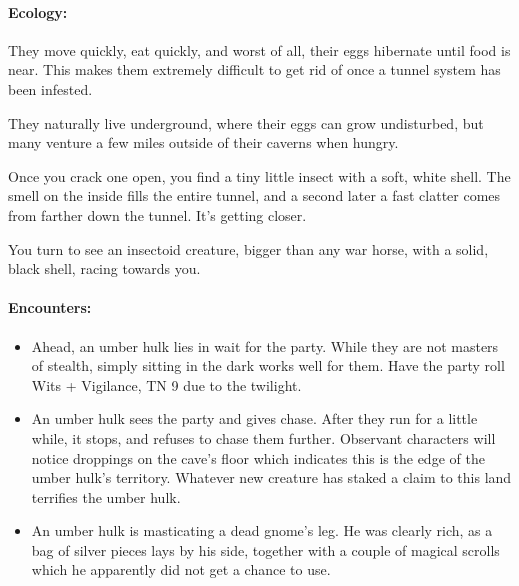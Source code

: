 \begin{multicols}{2}
\paragraph{Ecology:}
They move quickly, eat quickly, and worst of all, their eggs hibernate until food is near.
This makes them extremely difficult to get rid of once a tunnel system has been infested.

They naturally live underground, where their eggs can grow undisturbed, but many venture a few miles outside of their caverns when hungry.

\begin{boxtext}

  Once you crack one open, you find a tiny little insect with a soft, white shell.
  The smell on the inside fills the entire tunnel, and a second later a fast clatter comes from farther down the tunnel.
  It's getting closer.

  You turn to see an insectoid creature, bigger than any war horse, with a solid, black shell, racing towards you.

\end{boxtext}

\paragraph{Encounters:}

\begin{itemize}

  \item
  Ahead, an umber hulk lies in wait for the party.
  While they are not masters of stealth, simply sitting in the dark works well for them.
  Have the party roll Wits + Vigilance, TN 9 due to the twilight.
  \item
  An umber hulk sees the party and gives chase.
  After they run for a little while, it stops, and refuses to chase them further.
  Observant characters will notice droppings on the cave's floor which indicates this is the edge of the umber hulk's territory.
  Whatever new creature has staked a claim to this land terrifies the umber hulk.
  \item
  An umber hulk is masticating a dead gnome's leg.
  He was clearly rich, as a bag of silver pieces lays by his side, together with a couple of magical scrolls which he apparently did not get a chance to use.

\end{itemize}

\umberhulk


\end{multicols}
